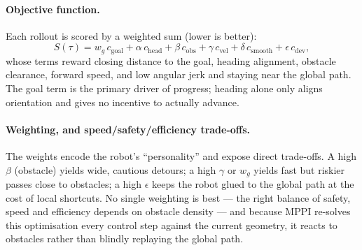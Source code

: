 \paragraph{Objective function.} Each rollout is scored by a weighted sum (lower is better):
\begin{equation}
    S(\tau) = w_g\,c_\text{goal} + \alpha\,c_\text{head} + \beta\,c_\text{obs}
            + \gamma\,c_\text{vel} + \delta\,c_\text{smooth} + \epsilon\,c_\text{dev},
\end{equation}
whose terms reward closing distance to the goal, heading alignment, obstacle clearance, forward speed, and low angular jerk and staying
near the global path. The goal term is the primary driver of progress; heading alone only
aligns orientation and gives no incentive to actually advance.

\paragraph{Weighting, and speed/safety/efficiency trade-offs.} The weights encode the
robot's ``personality'' and expose direct trade-offs. A high $\beta$ (obstacle) yields wide,
cautious detours; a high $\gamma$ or $w_g$ yields fast but riskier passes close to obstacles;
a high $\epsilon$ keeps the robot glued to the global path at the cost of local shortcuts.
No single weighting is best --- the right balance of safety, speed and efficiency depends on
obstacle density --- and because MPPI re-solves this optimisation every control step against
the current geometry, it reacts to obstacles rather than blindly replaying the global path.

